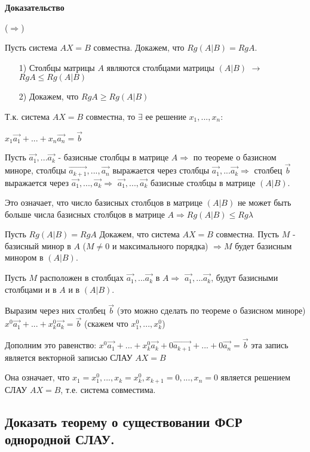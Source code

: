 \vspace*{15pt}

{\bf{Доказательство}}

($\Rightarrow$)  

Пусть система $AX = B$ совместна.
Докажем, что $Rg(A|B) = RgA$.
\begin{enumerate}
    \item [1)] Столбцы матрицы $A$ являются столбцами матрицы $(A|B)$ $\rightarrow$ $RgA \leqslant Rg(A|B)$
    \item [2)] Докажем, что $RgA \geqslant Rg(A|B)$
\end{enumerate} 


Т.к. система $AX = B$ совместна, то $\exists$ ее решение $x_1, ..., x_n:$

$x_1 \vec{a_1} + ... + x_n \vec{a_n} = \vec{b}$

Пусть $\vec{a_1},...\vec{a_k}$ - базисные столбцы в матрице $A \Rightarrow$ по теореме о базисном миноре, столбцы $\vec{a_{k+1}}, ..., \vec{a_n}$ выражается через столбцы $\vec{a_1},...\vec{a_k} \Rightarrow$ столбец $\vec{b}$ выражается через $\vec{a_1},... , \vec{a_k} \Rightarrow$ $\vec{a_1},... , \vec{a_k}$ базисные столбцы в матрице $(A|B)$.

Это означает, что число базисных столбцов в матрице $(A|B)$ не может быть больше числа базисных столбцов в матрице $A \Rightarrow Rg(A|B)\leqslant Rg\lambda$

Пусть $Rg(A|B) = RgA$
Докажем, что система $AX = B$ совместна. Пусть $M$ - базисный минор в $A$ ($M \ne 0$ и максимального порядка) $\Rightarrow M$ будет базисным минором в $(A|B)$.

Пусть $M$ расположен в столбцах $\vec{a_1},...\vec{a_k}$ в $A \Rightarrow$ $\vec{a_1},...\vec{a_k}$, будут базисными столбцами и в $A$ и в $(A|B)$.

Выразим через них столбец $\vec{b}$ (это можно сделать по теореме о базисном миноре) $x^0\vec{a_1}+...+x^0_k\vec{a_k} = \vec{b}$ (скажем что $x^0_1, ..., x^0_k$)

Дополним это равенство:
$x^0\vec{a_1}+...+x^0_k\vec{a_k} +0\vec{a_{k+1}}+...+0\vec{a_n} = \vec{b}$
эта запись является векторной записью СЛАУ $AX = B$

Она означает, что $x_1 = x^0_1, ..., x_k = x^0_k, x_{k+1} = 0, ..., x_n = 0$ является решением СЛАУ $AX = B$, т.е. система совместима.

\ep

\subsection{Доказать теорему о существовании ФСР однородной СЛАУ.}

